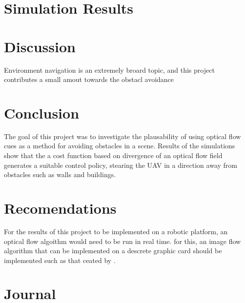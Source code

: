 \documentclass{UoNMCHA}
\numberwithin{equation}{section}
\begin{document}
\newpage
\section{Simulation Results}
\newpage
\section{Discussion}
Environment navigation is an extremely broard topic, and this project contributes a small amout towards the obstacl avoidance 
\newpage
\section{Conclusion}\label{sec:Conclusion}
The goal of this project was to investigate the plausability of using optical flow cues as a method for avoiding obstacles in a scene. Results of the simulations show that the a cost function based on divergence of an optical flow field generates a suitable control policy, stearing the UAV in a direction away from obstacles such as walls and buildings. 

\newpage
\section{Recomendations}
For the results of this project to be implemented on a robotic platform, an optical flow algoithm would need to be run in real time. for this, an image flow algorithm that can be implemented on a descrete graphic card should be implemented such as that ceated by \cite{adarve2016filter}.


\newpage


\appendix
\newpage
\section{Journal}\label{app:Journal}
\newpage
\end{document}

